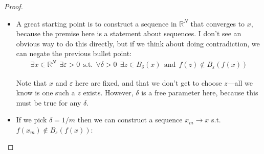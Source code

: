\documentclass{article}
\begin{document}
\begin{proof}
\begin{enumerate}[a.]
\begin{itemize}[label=$\bullet$]
        \item A great starting point is to construct a sequence in $\mathbb{R}^N$ that converges to $x$, because the premise here is a statement about sequences. I don't see an obvious way to do this directly, but if we think about doing contradiction, we can negate the previous bullet point:
          \begin{align*}
            \exists x \in \mathbb{R}^N
            ~~
            \exists \varepsilon > 0
            ~~\text{s.t.}~~
            \forall \delta > 0
            ~~
            \exists z \in B_{\delta}(x)
            ~~\text{and}~~
            f(z) \notin B_{\varepsilon}(f(x))
          \end{align*}

          Note that $x$ and $\varepsilon$ here are fixed, and that we don't get to choose $z$---all we know is one such a $z$ exists. However, $\delta$ is a free parameter here, because this must be true for any $\delta$.

        \item If we pick $\delta = 1/m$ then we can construct a sequence $x_m \to x$ s.t. $f(x_m) \notin B_{\varepsilon}(f(x))$:
        \begin{figure}[H]
          \centering
\end{figure}
\end{itemize}
\end{enumerate}
\end{proof}
\end{document}

